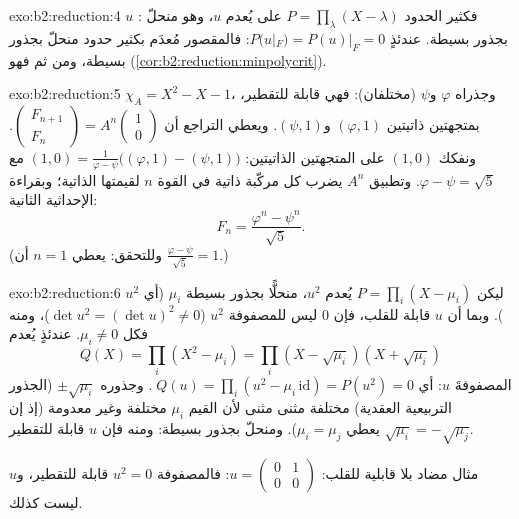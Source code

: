 \begin{solution}{exo:b2:reduction:4}
$u$ : فكثير الحدود $P = \prod_{\lambda}(X - \lambda)$ على
 يُعدم $u$، وهو منحلّ بجذور بسيطة. عندئذٍ $P(u|_F) =
P(u)|_F = 0$: فالمقصور مُعدَم بكثير حدود منحلّ
بجذور بسيطة، ومن ثم فهو 
(\cref{cor:b2:reduction:minpolycrit}).
\end{solution}

\begin{solution}{exo:b2:reduction:5}
$\chi_A = X^2 - X - 1$، وجذراه $\varphi$ و$\psi$ (مختلفان):
فهي قابلة للتقطير، بمتجهتين ذاتيتين $(\varphi, 1)$ و$(\psi, 1)$.
ويعطي التراجع أن $\begin{pmatrix} F_{n+1}\\ F_n \end{pmatrix} =
A^n \begin{pmatrix}1\\ 0\end{pmatrix}$. ونفكك $(1, 0)$ على
المتجهتين الذاتيتين: $(1,0) = \frac{1}{\varphi - \psi}\bigl((\varphi, 1) -
(\psi, 1)\bigr)$ مع $\varphi - \psi = \sqrt5$. وتطبيق $A^n$
يضرب كل مركّبة ذاتية في القوة $n$ لقيمتها الذاتية؛
وبقراءة الإحداثية الثانية:
\[
F_n = \frac{\varphi^n - \psi^n}{\sqrt 5} .
\]
(وللتحقق: يعطي $n = 1$ أن $\frac{\varphi - \psi}{\sqrt5} = 1$.)
\end{solution}

\begin{solution}{exo:b2:reduction:6}
ليكن $P = \prod_i (X - \mu_i)$ يُعدم $u^2$، منحلًّا بجذور
بسيطة $\mu_i$ (أي  $u^2$). وبما أن $u$ قابلة للقلب، فإن $0$
ليس  للمصفوفة $u^2$ ($\det u^2 = (\det u)^2 \neq 0$)، ومنه
فكل $\mu_i \neq 0$. عندئذٍ يُعدم
\[
Q(X) = \prod_i (X^2 - \mu_i) = \prod_i (X - \sqrt{\mu_i})(X +
\sqrt{\mu_i})
\]
المصفوفةَ $u$: أي $\;Q(u) = \prod_i (u^2 - \mu_i\,\mathrm{id}) =
P(u^2) = 0$. وجذوره $\pm
\sqrt{\mu_i}$ (الجذور التربيعية العقدية) مختلفة مثنى مثنى لأن
القيم $\mu_i$ مختلفة وغير معدومة (إذ إن $\sqrt{\mu_i} = -\sqrt{\mu_j}$
يعطي $\mu_i = \mu_j$). ومنحلّ بجذور بسيطة: ومنه فإن $u$
قابلة للتقطير.

مثال مضاد بلا قابلية للقلب: $u = \begin{pmatrix} 0 & 1\\
0 & 0\end{pmatrix}$: فالمصفوفة $u^2 = 0$ قابلة للتقطير، و$u$ ليست كذلك.
\end{solution}

